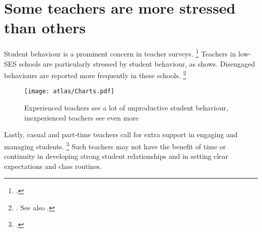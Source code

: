 \documentclass[FrontPage]{grattan}
\begin{document}
\section{Some teachers are more stressed than others}\label{sec:more-stressed-than-others}
Student behaviour is a prominent concern in teacher surveys.%
    \footcites{Buchanan2013TeacherRetentionAttrition}{Feltoe2013ComparingTeacherStress}{Richards2012TeacherStressCoping}{Stoughton2007HowWillI}
Teachers in low-SES schools are particularly stressed by student behaviour, as  shows.
Disengaged behaviours are reported more frequently in these schools.%
    \footnote{\textcite{Sullivan2014PunishThemEngage}. See also .}

\begin{figure}
\caption{Experienced teachers see a lot of unproductive student behaviour, inexperienced teachers see even more\label{fig:all-teachers-experience-unproductive-behaviour}}%
\texttt{[image: atlas/Charts.pdf]}
%
\end{figure}

\citetrackerfalse 
{}

Lastly, casual and part-time teachers call for extra support in engaging and managing students.%
    \footcites{Buchanan2013TeacherRetentionAttrition}{TEMAG2016ActionNowClassroom}{Mayer2014LongitudinalTeacherEducation} 
Such teachers may not have the benefit of time or continuity in developing strong student relationships and in setting clear expectations and class routines.
\end{document}

